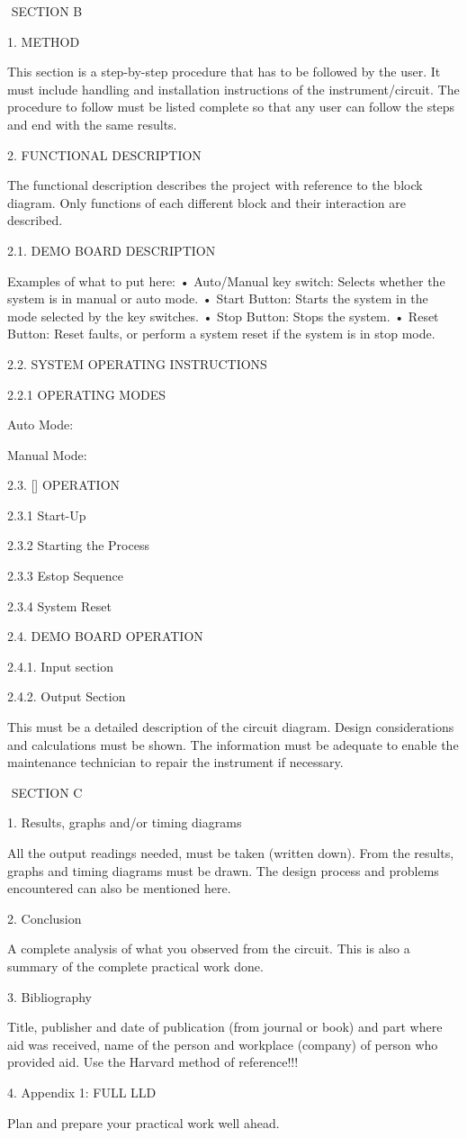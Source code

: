 \documentclass[a4]{article}
\begin{document}
    ​ SECTION B

    1. METHOD

This section is a step-by-step procedure that has to be followed by the user. It must include handling and installation instructions of the instrument/circuit.
The procedure to follow must be listed complete so that any user can follow the steps and end with the same results.

    2. FUNCTIONAL DESCRIPTION

The functional description describes the project with reference to the block diagram. Only functions of each different block and their interaction are described.


        2.1. DEMO BOARD DESCRIPTION

Examples of what to put here:
    • Auto/Manual key switch: Selects whether the system is in manual or auto mode. 
    •   Start Button:	Starts the system in the mode selected by the key switches.
    • Stop Button:	Stops the system.
    • Reset Button:	Reset faults, or perform a system reset if the system is in stop mode.


        2.2. SYSTEM OPERATING INSTRUCTIONS


            2.2.1 OPERATING MODES


Auto Mode: 

Manual Mode: 


        2.3.  [] OPERATION

            2.3.1 Start-Up

            2.3.2 Starting the Process

            2.3.3 Estop Sequence


            2.3.4 System Reset



       2.4. DEMO BOARD OPERATION

            2.4.1. Input section 

            2.4.2. Output Section

This must be a detailed description of the circuit diagram. Design considerations and calculations must be shown. The information must be adequate to enable the maintenance technician to repair the instrument if necessary.




    ​ SECTION C

        1. Results, graphs and/or timing diagrams

All the output readings needed, must be taken (written down). From the results, graphs and timing diagrams must be drawn.
The design process and problems encountered can also be mentioned here.

        2. Conclusion

A complete analysis of what you observed from the circuit. This is also a summary of the complete practical work done.

        3. Bibliography

Title, publisher and date of publication (from journal or book) and part where aid was received, name of the person and workplace (company) of person who provided aid.
Use the Harvard method of reference!!!


        4. Appendix 1: FULL LLD


Plan and prepare your practical work well ahead. 
\end{document}
